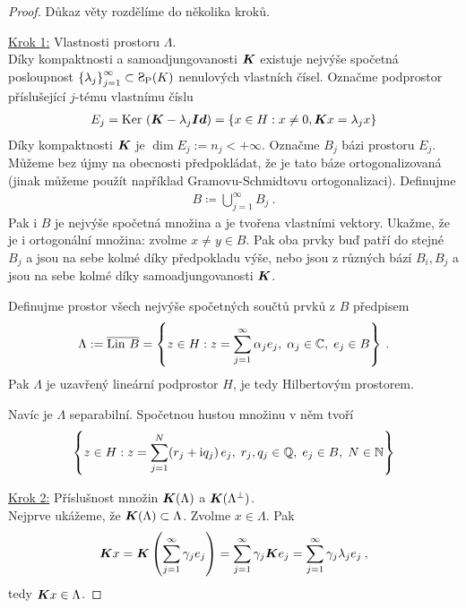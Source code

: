 \begin{proof}
Důkaz věty rozdělíme do několika kroků.

\underline{Krok 1:} Vlastnosti prostoru $\Lambda$. \\
Díky kompaktnosti a samoadjungovanosti $\boldsymbol{K}$ existuje nejvýše spočetná posloupnost $\sequence{\lambda_j}{j} \subset \SpP(K)$ nenulových vlastních čísel. Označme podprostor příslušející $j$-tému vlastnímu číslu
\begin{align*}
    E_j = \operatorname{Ker}\, \left( \boldsymbol{K} - \lambda_j \boldsymbol{Id} \right) = \lbrace x \in H : x \neq 0, \boldsymbol{K} x = \lambda_j x \rbrace
\end{align*}
Díky kompaktnosti $\boldsymbol{K}$ je $\dim E_j := n_j < + \infty$. Označme $B_j$ bázi prostoru $E_j$. Můžeme bez újmy na obecnosti předpokládat, že je tato báze ortogonalizovaná (jinak můžeme použít například Gramovu-Schmidtovu ortogonalizaci). Definujme \begin{align*}
    B \coloneqq \bigcup_{j=1}^\infty B_j \:.
\end{align*}
Pak i $B$ je nejvýše spočetná množina a je tvořena vlastními vektory. Ukažme, že je i ortogonální množina: zvolme $x \neq y \in B$. Pak oba prvky buď patří do stejné $B_j$ a jsou na sebe kolmé díky předpokladu výše, nebo jsou z různých bází $B_i, B_j$ a jsou na sebe kolmé díky samoadjungovanosti $\boldsymbol{K}$.

Definujme prostor všech nejvýše spočetných součtů prvků z $B$ předpisem \begin{align*}
    \Lambda := \overline{\operatorname{Lin}\, B} =
    \left\lbrace
        z \in H:
        z = \sum_{j=1}^\infty \alpha_j e_j, \;
        \alpha_j \in \mathbb{C},
        \; e_j \in B
    \right\rbrace \:.
\end{align*}
Pak $\Lambda$ je uzavřený lineární podprostor $H$, je tedy Hilbertovým prostorem. 

Navíc je $\Lambda$ separabilní. Spočetnou hustou množinu v něm tvoří \begin{align*}
    \left\lbrace
        z \in H:
        z = \sum_{j=1}^N (r_j + \mathrm{i} q_j) \, e_j, \;
        r_j, q_j \in \mathbb{Q}, \;
        e_j \in B, \;
        N \in \mathbb{N} \right\rbrace
\end{align*}

\underline{Krok 2:} Příslušnost množin $\boldsymbol{K}(\Lambda)$ a $\boldsymbol{K}(\Lambda^\bot)$. \\
Nejprve ukážeme, že $\boldsymbol{K}(\Lambda) \subset \Lambda$. Zvolme $x \in \Lambda$. Pak \begin{align*}
    \boldsymbol{K} x = \boldsymbol{K} \left(\sum_{j=1}^\infty \gamma_j e_j \right) = \sum_{j=1}^\infty \gamma_j \boldsymbol{K} e_j = \sum_{j=1}^\infty \gamma_j \lambda_j e_j \:,
\end{align*}
tedy $\boldsymbol{K} x \in \Lambda$. 


\end{proof}
